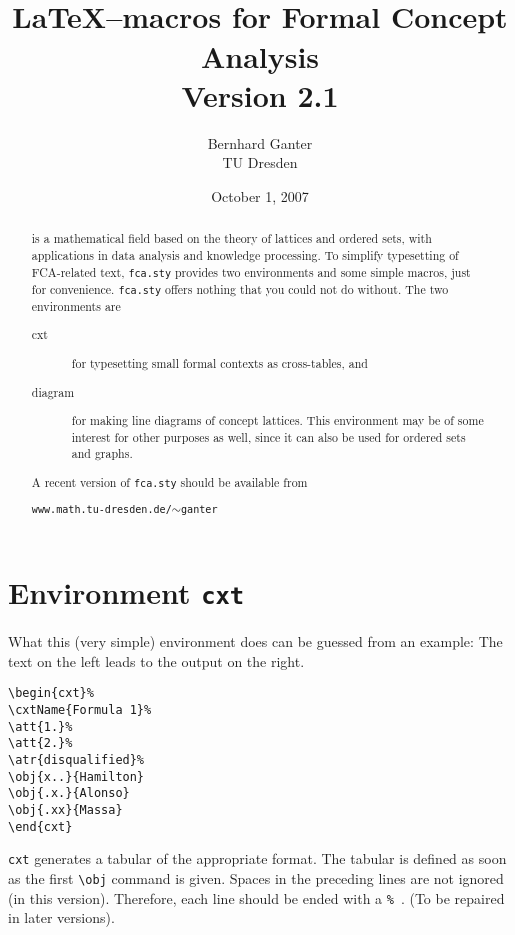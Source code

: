 \documentclass[12pt]{article}
\title{\fcastyle\\\LaTeX--macros for Formal Concept Analysis\\
{ Version 2.1}}
\author{Bernhard Ganter\\ TU Dresden}
\date{October 1, 2007}
\def\fcastyle{\texttt{fca.sty}\xspace}
\begin{document}
\maketitle
\begin{abstract}
\FCA is a mathematical field based on the theory of lattices and ordered
sets, with applications in data analysis and knowledge processing. 
To simplify typesetting of FCA-related text, \fcastyle  provides two
environments and some simple macros, just for convenience. \fcastyle offers
nothing that you could not do without. The two environments are
\begin{description}
\item[cxt] for typesetting small formal contexts as cross-tables, and
\item [diagram] for making line diagrams of concept lattices. This environment
  may be of some interest for other purposes as well, since it can also be
  used for ordered sets and graphs.
\end{description}
A recent version of \texttt{fca.sty} should be available from
\begin{center}
  \texttt{www.math.tu-dresden.de/$\sim$ganter}
\end{center}
\end{abstract}
%
%
\section{Environment \texttt{cxt}}
What this (very simple) environment does can be guessed from an example:
The text on the left leads to the output on the right.\bigbreak

\noindent\begin{minipage}{.45\textwidth}
\begin{verbatim}
\begin{cxt}%
\cxtName{Formula 1}%
\att{1.}%
\att{2.}%
\atr{disqualified}%
\obj{x..}{Hamilton}
\obj{.x.}{Alonso}
\obj{.xx}{Massa}
\end{cxt}
\end{verbatim}
\end{minipage}
\hfill
\begin{minipage}{.40\textwidth}
\begin{cxt}%
%
%
%
%
\end{cxt}
\end{minipage}
\bigbreak

\texttt{cxt} generates a tabular of the appropriate format. The tabular is
defined as soon as the first \verb|\obj| command is given. Spaces in the 
preceding lines are not ignored (in this version). Therefore, each line should
be ended with a \texttt{\%}\ . (To be repaired in later versions).
\medbreak
 
\end{document}
